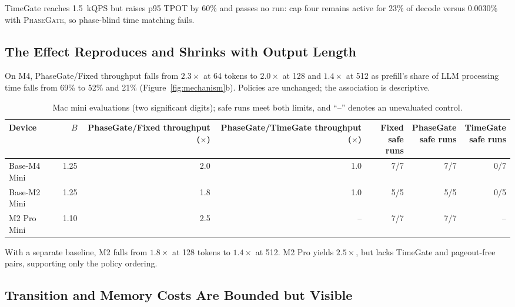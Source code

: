 \documentclass{article}
\newcommand{\system}{\textsc{PhaseGate}\xspace}
\begin{document}
TimeGate reaches 1.5~kQPS but raises p95 TPOT by 60\% and passes no run: cap four remains active for 23\% of decode versus 0.0030\% with \system, so phase-blind time matching fails.

\subsection{The Effect Reproduces and Shrinks with Output Length}

On M4, PhaseGate/Fixed throughput falls from $2.3\times$ at 64 tokens to $2.0\times$ at 128 and $1.4\times$ at 512 as prefill's share of LLM processing time falls from 69\% to 52\% and 21\% (Figure~\ref{fig:mechanism}b).
Policies are unchanged; the association is descriptive.

\begin{table}[h]
  \caption{Mac mini evaluations (two significant digits); safe runs meet both limits, and ``--'' denotes an unevaluated control.}
  \label{tab:crossdevice}
  \centering
  \scriptsize
  \setlength{\tabcolsep}{1.7pt}
  \begin{tabular}{lrrrrrr}
    \toprule
    Device & $B$ & \shortstack{PhaseGate/Fixed\\throughput ($\times$)} & \shortstack{PhaseGate/TimeGate\\throughput ($\times$)} & \shortstack{Fixed\\safe runs} & \shortstack{PhaseGate\\safe runs} & \shortstack{TimeGate\\safe runs} \\
    \midrule
    Base-M4 Mini & 1.25 & 2.0 & 1.0 & 7/7 & 7/7 & 0/7 \\
    Base-M2 Mini & 1.25 & 1.8 & 1.0 & 5/5 & 5/5 & 0/5 \\
    M2 Pro Mini & 1.10 & 2.5 & -- & 7/7 & 7/7 & -- \\
    \bottomrule
  \end{tabular}
\end{table}

With a separate baseline, M2 falls from $1.8\times$ at 128 tokens to $1.4\times$ at 512.
M2 Pro yields $2.5\times$, but lacks TimeGate and pageout-free pairs, supporting only the policy ordering.

\subsection{Transition and Memory Costs Are Bounded but Visible}
\end{document}
